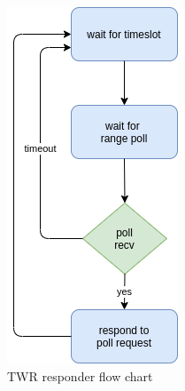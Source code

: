 \documentclass[\main/main.tex]{subfiles}
\begin{document}
\begin{figure}[H]
    \begin{center}
        \includegraphics[scale=0.5]{twr_responder.png}
    \end{center}
    \caption{TWR responder flow chart}
    \label{fig:twr_responder}
\end{figure}

\bib
\end{document}
